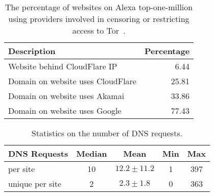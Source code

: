 \begin{table}[t]
	\centering
	\begin{tabular}{l r}
	\toprule
	\textbf{Description} & \textbf{Percentage} \\
	\midrule
	Website behind CloudFlare IP & 6.44 \\
	Domain on website uses CloudFlare & 25.81 \\
	Domain on website uses Akamai & 33.86 \\
	Domain on website uses Google & 77.43 \\
	\bottomrule
	\end{tabular}
	\caption{The percentage of websites on Alexa top-one-million using providers
	involved in censoring or restricting access to Tor~\cite{Khattak2016a}.}
	\label{tab:dns-censor}
\end{table}

\begin{table}[t]
	\centering
	\begin{tabular}{l c c c c}
	\toprule
	\textbf{DNS Requests} & \textbf{Median} & \textbf{Mean} & \textbf{Min} & \textbf{Max} \\
	\midrule
	per site & 10 & $12.2\pm11.2$ & 1 & 397 \\
	unique per site & 2 & $2.3\pm1.8$ & 0 & 363 \\
	\bottomrule
	\end{tabular}
	\caption{Statistics on the number of DNS requests.}
	\label{tab:daw-unique}
\end{table}


